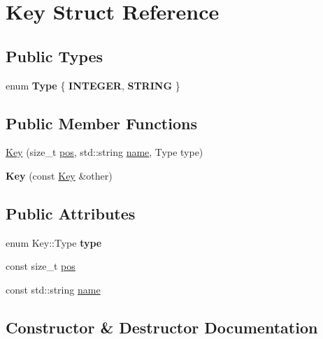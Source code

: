 \hypertarget{struct_key}{}\section{Key Struct Reference}
\label{struct_key}
\subsection*{Public Types}
\begin{DoxyCompactItemize}
\item 
\mbox{\label{struct_key_af9f531cb7a650ac4443bc36921f4aef1}} 
enum {\bfseries Type} \{ {\bfseries I\+N\+T\+E\+G\+ER}, 
{\bfseries S\+T\+R\+I\+NG}
 \}
\end{DoxyCompactItemize}
\subsection*{Public Member Functions}
\begin{DoxyCompactItemize}
\item 
\hyperlink{struct_key_ad108fbab0fbfc1cccae0a6c780b1f016}{Key} (size\+\_\+t \hyperlink{struct_key_a8615357b0e4281e5b2c782b0f5441717}{pos}, std\+::string \hyperlink{struct_key_a824cd6550546a339025b1552b9fee834}{name}, Type type)
\item 
\mbox{\label{struct_key_aec6ac8988c28381589ae5c92ddd8c320}} 
{\bfseries Key} (const \hyperlink{struct_key}{Key} \&other)
\end{DoxyCompactItemize}
\subsection*{Public Attributes}
\begin{DoxyCompactItemize}
\item 
\mbox{\label{struct_key_ae6ca1b14612f6b42350e15780c325468}} 
enum Key\+::\+Type {\bfseries type}
\item 
const size\+\_\+t \hyperlink{struct_key_a8615357b0e4281e5b2c782b0f5441717}{pos}
\item 
const std\+::string \hyperlink{struct_key_a824cd6550546a339025b1552b9fee834}{name}
\end{DoxyCompactItemize}


\subsection{Constructor \& Destructor Documentation}
\mbox{\label{struct_key_ad108fbab0fbfc1cccae0a6c780b1f016}} 
